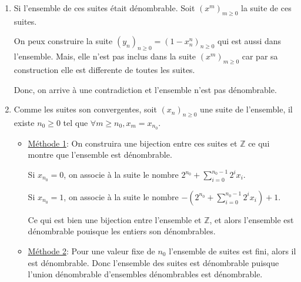 \documentclass[10pt,a4paper,oneside]{article}
\newenvironment{solution}[1][Solution]{\begin{trivlist}
\item[\hskip \labelsep {\bfseries #1}]}{\end{trivlist}}
\begin{document}
\begin{solution}
\begin{enumerate}
\item
Si l'ensemble de ces suites était dénombrable. Soit $(x^m)_{m \geq 0}$ la suite de ces suites.

On peux construire la suite $(y_n)_{n \geq 0} = (1 - x^n_n)_{n \geq 0}$ qui est aussi dans l'ensemble. Mais, elle n'est pas inclus dans la suite $(x^m)_{m \geq 0}$ car par sa construction elle est differente de toutes les suites.

Donc, on arrive à une contradiction et l'ensemble n'est pas dénombrable.

\item
Comme les suites son convergentes, soit $(x_n)_{n \geq 0}$ une suite de l'ensemble, il existe $n_0 \geq 0$ tel que $\forall m \geq n_0, x_m = x_{n_0}$.

\begin{itemize}
\item
\underline{Méthode 1}:
On construira une bijection entre ces suites et $\mathbb{Z}$ ce qui montre que l'ensemble est dénombrable.

Si $x_{n_0} = 0$, on associe à la suite le nombre $2^{n_0} + \sum_{i = 0}^{n_0 - 1} 2^i x_i$.

Si $x_{n_0} = 1$, on associe à la suite le nombre $-(2^{n_0} + \sum_{i = 0}^{n_0 - 1} 2^i x_i) + 1$.

Ce qui est bien une bijection entre l'ensemble et $\mathbb{Z}$, et alors l'ensemble est dénombrable pouisque les entiers son dénombrables.

\item
\underline{Méthode 2}:
Pour une valeur fixe de $n_0$ l'ensemble de suites est fini, alors il est dénombrable. Donc l'ensemble des suites est dénombrable puisque l'union dénombrable d'ensembles dénombrables est dénombrable.
\end{itemize}

\end{enumerate}
\end{solution}
\end{document}
